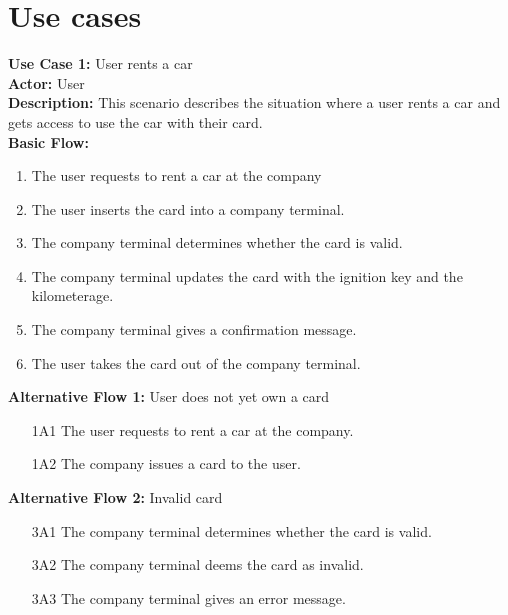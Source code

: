 \documentclass[a4paper]{article}
\begin{document}
\section{Use cases} %
\textbf{Use Case 1:} User rents a car\\
\textbf{Actor:} User\\
\textbf{Description:} This scenario describes the situation where a user rents a car and gets access to use the car with their card.\\
\textbf{Basic Flow:}
\begin{enumerate}
    \item The user requests to rent a car at the company
    \item The user inserts the card into a company terminal.
    \item The company terminal determines whether the card is valid.
    \item The company terminal updates the card with the ignition key and the kilometerage.
    \item The company terminal gives a confirmation message.
    \item The user takes the card out of the company terminal.
\end{enumerate}
\textbf{Alternative Flow 1:} User does not yet own a card
\begin{enumerate}
    \item[1A1] The user requests to rent a car at the company.
    \item[1A2] The company issues a card to the user.
\end{enumerate}
\textbf{Alternative Flow 2:} Invalid card
\begin{enumerate}
    \item[3A1] The company terminal determines whether the card is valid.
    \item[3A2] The company terminal deems the card as invalid.
    \item[3A3] The company terminal gives an error message.
\end{enumerate}
\end{document}
